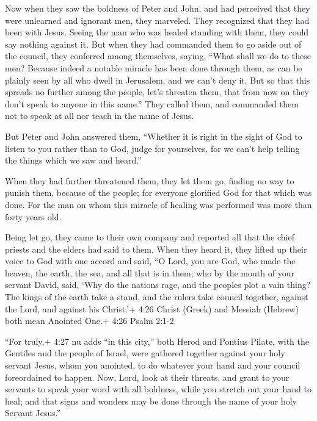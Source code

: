  Now when they saw the boldness of Peter and John, and had
perceived that they were unlearned and ignorant men, they marveled. They
recognized that they had been with Jesus.  Seeing the man
who was healed standing with them, they could say nothing against it.
 But when they had commanded them to go aside out of the
council, they conferred among themselves,  saying, ``What
shall we do to these men? Because indeed a notable miracle has been done
through them, as can be plainly seen by all who dwell in Jerusalem, and
we can't deny it.  But so that this spreads no further
among the people, let's threaten them, that from now on they don't speak
to anyone in this name.''  They called them, and commanded
them not to speak at all nor teach in the name of Jesus.

 But Peter and John answered them, ``Whether it is right in
the sight of God to listen to you rather than to God, judge for
yourselves,  for we can't help telling the things which we
saw and heard.''

 When they had further threatened them, they let them go,
finding no way to punish them, because of the people; for everyone
glorified God for that which was done.  For the man on whom
this miracle of healing was performed was more than forty years old.

 Being let go, they came to their own company and reported
all that the chief priests and the elders had said to them.
 When they heard it, they lifted up their voice to God with
one accord and said, ``O Lord, you are God, who made the heaven, the
earth, the sea, and all that is in them;  who by the mouth
of your servant David, said, `Why do the nations rage, and the peoples
plot a vain thing?  The kings of the earth take a stand,
and the rulers take council together, against the Lord, and against his
Christ.'+ 4:26 Christ (Greek) and Messiah (Hebrew) both mean Anointed
One.+ 4:26 Psalm 2:1-2

 ``For truly,+ 4:27 nu adds ``in this city,'' both Herod
and Pontius Pilate, with the Gentiles and the people of Israel, were
gathered together against your holy servant Jesus, whom you anointed,
 to do whatever your hand and your council foreordained to
happen.  Now, Lord, look at their threats, and grant to
your servants to speak your word with all boldness,  while
you stretch out your hand to heal; and that signs and wonders may be
done through the name of your holy Servant Jesus.''

